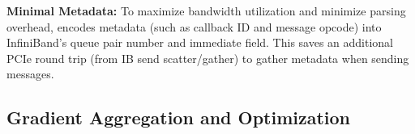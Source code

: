 \noindent \textbf{Minimal Metadata:} To maximize bandwidth utilization and minimize parsing overhead, \phub encodes metadata (such as callback ID and message opcode) into InfiniBand's queue pair number and immediate field. This saves \phub an additional PCIe round trip (from IB send scatter/gather) to gather metadata when sending messages.


\subsection{Gradient Aggregation and Optimization}
\label{sec:tallvswide}


